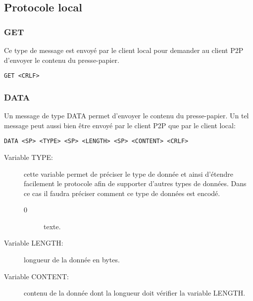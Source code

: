 \subsection{Protocole local}
\subsubsection*{GET}
Ce type de message est envoyé par le client local pour demander au client P2P
d'envoyer le contenu du presse-papier.
\begin{verbatim}
GET <CRLF>
\end{verbatim}

\hrulefill

\subsubsection*{DATA}
Un message de type DATA permet d'envoyer le contenu du presse-papier. Un tel
message peut aussi bien être envoyé par le client P2P que par le client local:
\begin{verbatim}
DATA <SP> <TYPE> <SP> <LENGTH> <SP> <CONTENT> <CRLF>
\end{verbatim}
\begin{description}
\item[Variable TYPE:] cette variable permet de préciser le type
  de donnée et ainsi d'étendre facilement le protocole afin de supporter
  d'autres types de données. Dans ce cas il faudra préciser comment ce type
  de données est encodé.
  \begin{description}
  \item[0] texte.
  \end{description}
\item[Variable LENGTH:] longueur de la donnée en bytes.
\item[Variable CONTENT:] contenu de la donnée dont la longueur
  doit vérifier la variable LENGTH.
\end{description}
